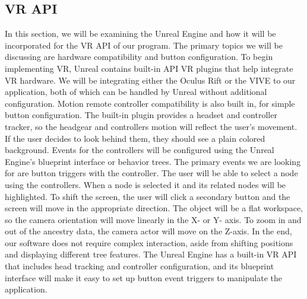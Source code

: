 \documentclass[onecolumn, draftclsnofoot, 10pt, compsoc]{IEEEtran}
\begin{document}
\begin{singlespace}
\end{singlespace}

\subsection{VR API}
\begin{singlespace}
In this section, we will be examining the Unreal Engine and how it will be incorporated for the VR API of our program. The primary topics we will be discussing are hardware compatibility and button configuration.
\newline
\newline
To begin implementing VR, Unreal contains built-in API VR plugins that help integrate VR hardware. We will be integrating either the Oculus Rift or the VIVE to our application, both of which can be handled by Unreal without additional configuration. Motion remote controller compatibility is also built in, for simple button configuration. The built-in plugin provides a headset and controller tracker, so the headgear and controllers motion will reflect the user’s movement. If the user decides to look behind them, they should see a plain colored background. 
\newline
\newline
Events for the controllers will be configured using the Unreal Engine’s blueprint interface or behavior trees. The primary events we are looking for are button triggers with the controller. The user will be able to select a node using the controllers. When a node is selected it and its related nodes will be highlighted.
\newline
\newline
To shift the screen, the user will click a secondary button and the screen will move in the appropriate direction. The object will be a flat workspace, so the camera orientation will move linearly in the X- or Y- axis. To zoom in and out of the ancestry data, the camera actor will move on the Z-axis.  
\newline
\newline
In the end, our software does not require complex interaction, aside from shifting positions and displaying different tree features. The Unreal Engine has a built-in VR API that includes head tracking and controller configuration, and its blueprint interface will make it easy to set up button event triggers to manipulate the application. 


\end{singlespace}
\end{document}
